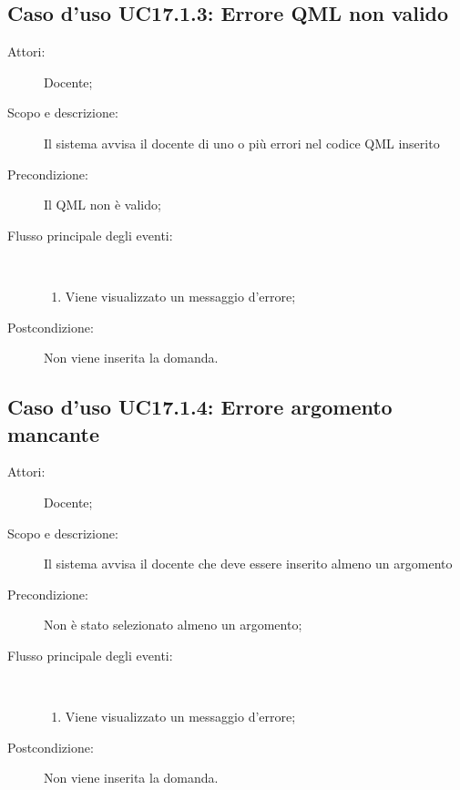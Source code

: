 \subsection{Caso d'uso UC17.1.3: Errore QML non valido}\begin{description}
	\item[Attori:] Docente;
	\item[Scopo e descrizione:] Il sistema avvisa il docente di uno o più errori nel codice QML inserito
	\item[Precondizione:] Il QML non è valido;
	
	\item[Flusso principale degli eventi:] \ 
	\begin{enumerate}
		\item Viene visualizzato un messaggio d'errore;
		
	\end{enumerate}
	\item[Postcondizione:] Non viene inserita la domanda.
\end{description}
\hypertarget{UC17.1.4}{}
\subsection{Caso d'uso UC17.1.4: Errore argomento mancante}\begin{description}
	\item[Attori:] Docente;
	\item[Scopo e descrizione:] Il sistema avvisa il docente che deve essere inserito almeno un argomento
	\item[Precondizione:] Non è stato selezionato almeno un argomento;
	
	\item[Flusso principale degli eventi:] \ 
	\begin{enumerate}
		\item Viene visualizzato un messaggio d'errore;
		
	\end{enumerate}
	\item[Postcondizione:] Non viene inserita la domanda.
\end{description}
\hypertarget{UC17.1.5}{}
